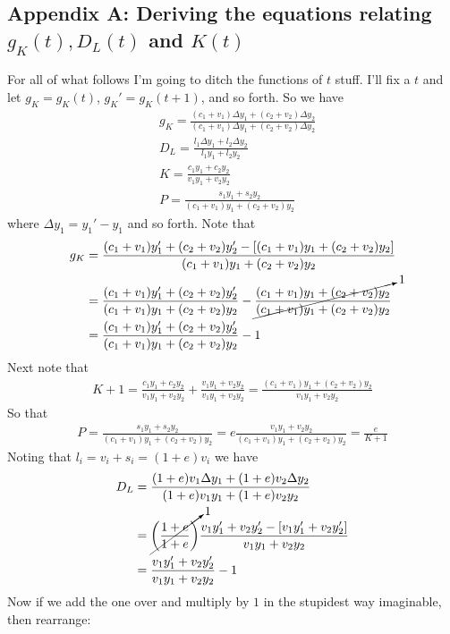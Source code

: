 \documentclass{article}
\theoremstyle{theorem}
\begin{document}
\subsection{Appendix A: Deriving the equations relating $g_K(t),D_L(t)$ and $K(t)$}\label{appendixA}
For all of what follows I'm going to ditch the functions of $t$ stuff. I'll fix a $t$ and let $g_K = g_K(t)$, $g_K' = g_K(t+1)$, and so forth. So we have 
\begin{align}
	& g_K = \frac{(c_1+v_1)\Delta y_1 +(c_2+v_2)\Delta y_2}{(c_1+v_1)\Delta y_1 + (c_2+v_2)\Delta y_2} \\
	& D_L = \frac{l_1\Delta y_1 + l_2 \Delta y_2}{l_1y_1 + l_2y_2} \\
	& K = \frac{c_1 y_1 + c_2 y_2}{v_1 y_1 + v_2 y_2} \\
	& P = \frac{s_1 y_1 + s_2 y_2}{(c_1 + v_1)y_1 + (c_2 + v_2) y_2}
\end{align} 
where $\Delta y_1 = y_1'-y_1$ and so forth. Note that
\begin{align}
	g_K &= \frac{(c_1+v_1)y_1' +(c_2+v_2)y_2' - [(c_1+v_1)y_1 + (c_2+v_2)y_2]}{(c_1+v_1)y_1 + (c_2+v_2)y_2} \\
	&= \frac{(c_1+v_1)y_1' +(c_2+v_2)y_2'}{(c_1+v_1) y_1 + (c_2+v_2) y_2} - \cancelto{1}{\frac{(c_1+v_1) y_1 + (c_2+v_2) y_2}{(c_1+v_1)y_1 + (c_2+v_2)y_2}} \\
	&=\frac{(c_1+v_1)y_1' +(c_2+v_2)y_2'}{(c_1+v_1) y_1 + (c_2+v_2) y_2} -1
\end{align}
Next note that 
\begin{align}
	K+1 = \frac{c_1 y_1 + c_2 y_2}{v_1 y_1 + v_2 y_2} + \frac{v_1 y_1 + v_2 y_2}{v_1 y_1 + v_2 y_2} = \frac{(c_1 + v_1) y_1 + (c_2 + v_2)y_2}{v_1 y_1 + v_2 y_2}
\end{align}
So that
\begin{align}
	P = \frac{s_1 y_1 + s_2 y_2}{(c_1 + v_1)y_1 + (c_2 + v_2) y_2} = e \frac{v_1 y_1 + v_2 y_2}{(c_1 + v_1) y_1 + (c_2 + v_2)y_2} = \frac{e}{K+1}
\end{align}
Noting that $l_i = v_i + s_i = (1+e)v_i$ we have
\begin{align}
	D_L &= \frac{(1+e)v_1\Delta y_1 + (1+e)v_2 \Delta y_2}{(1+e)v_1 y_1 + (1+e)v_2 y_2} \\ 
	&= \cancelto{1}{\left( \frac{1+e}{1+e} \right)} \frac{v_1 y_1' +v_2 y_2' - [v_1 y_1' + v_2 y_2']}{v_1 y_1 + v_2 y_2} \\
	&= \frac{v_1 y_1' +v_2 y_2'}{v_1 y_1 + v_2 y_2} - 1
\end{align}
Now if we add the one over and multiply by $1$ in the stupidest way imaginable, then rearrange:
\end{document}
